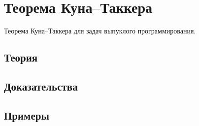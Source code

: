 
\section{Теорема Куна–Таккера}
\label{sec:2.4.07-kkt}

\begin{ticket}
Теорема Куна–Таккера для задач выпуклого программирования.
\end{ticket}

\subsection*{Теория}

\subsection*{Доказательства}

\subsection*{Примеры}

